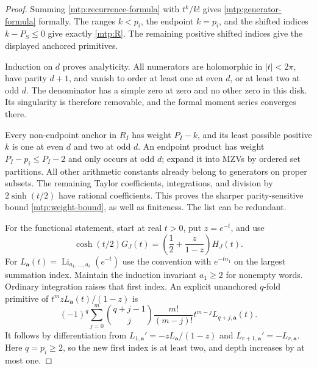 \begin{proof}
Summing \eqref{mtp:recurrence-formula} with $t^k/k!$ gives
\eqref{mtp:generator-formula} formally. The ranges $k<p_i$, the
endpoint $k=p_i$, and the shifted indices $k-P_S\le0$ give exactly
\eqref{mtp:R}. The remaining positive shifted indices give the displayed
anchored primitives.

Induction on $d$ proves analyticity. All numerators are holomorphic in
$|t|<2\pi$, have parity $d+1$, and vanish to order at least one at
even $d$, or at least two at odd $d$. The denominator has a simple
zero at zero and no other zero in this disk. Its singularity is
therefore removable, and the formal moment series converges there.

Every non-endpoint anchor in $R_I$ has weight $P_I-k$, and its least
possible positive $k$ is one at even $d$ and two at odd $d$. An
endpoint product has weight $P_I-p_i\le P_I-2$ and only occurs at
odd $d$; expand it into MZVs by ordered set partitions. All other
arithmetic constants already belong to generators on proper subsets.
The remaining Taylor coefficients, integrations, and division by
$2\sinh(t/2)$ have rational coefficients. This proves the sharper
parity-sensitive bound \eqref{mtp:weight-bound}, as well as finiteness.
The list can be redundant.

For the functional statement, start at real $t>0$, put $z=e^{-t}$,
and use
\[
 \cosh(t/2)G_J(t)=\left(\frac12+\frac z{1-z}\right)H_J(t).
\]
For $L_{\boldsymbol a}(t)=\operatorname{Li}_{a_1,\ldots,a_\ell}(e^{-t})$
use the convention with $e^{-tn_1}$ on the largest summation index.
Maintain the induction invariant $a_1\ge2$ for nonempty words.
Ordinary integration raises that first index. An explicit unanchored
$q$-fold primitive of $t^m zL_{\boldsymbol a}(t)/(1-z)$ is
\begin{equation}\label{mtp:polylog-primitive}
 (-1)^q\sum_{j=0}^m\binom{q+j-1}{j}\frac{m!}{(m-j)!}
                         t^{m-j}L_{q+j,\boldsymbol a}(t).
\end{equation}
It follows by differentiation from
$L_{1,\boldsymbol a}'=-zL_{\boldsymbol a}/(1-z)$ and
$L_{r+1,\boldsymbol a}'=-L_{r,\boldsymbol a}$. Here $q=p_i\ge2$,
so the new first index is at least two, and depth increases by at
most one.


\end{proof}
